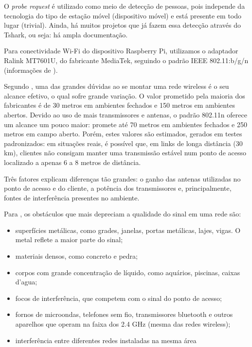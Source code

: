 O \emph{probe request} é utilizado como meio de detecção de pessoas, pois
independe da tecnologia do tipo de estação móvel (dispositivo móvel) e está presente em todo lugar (trivial). Ainda, há muitos projetos que já fazem essa detecção através do Tshark, ou seja: há ampla documentação.

Para conectividade Wi-Fi do dispositivo Raspberry Pi, utilizamos o adaptador Ralink MT7601U, do fabricante MediaTek, seguindo o padrão IEEE 802.11:b/g/n (informações de ).

Segundo , uma das grandes dúvidas ao se montar uma rede wireless é o seu alcance efetivo, o qual sofre grande variação. O valor prometido pela maioria dos fabricantes é de 30 metros em ambientes fechados e 150 metros em ambientes abertos. Devido ao uso de mais transmissores e antenas, o padrão 802.11n oferece um alcance um pouco maior: promete até 70 metros em ambientes fechados e 250 metros em campo aberto. Porém, estes valores são estimados, gerados em testes padronizados: em situações reais, é possível que, em links de longa distância (30 km), clientes não consigam manter uma transmissão estável num ponto de acesso localizado a apenas 6 a 8 metros de distância.

Três fatores explicam diferenças tão grandes: o ganho das antenas utilizadas no ponto de acesso e do cliente, a potência dos transmissores e, principalmente, fontes de interferência presentes no ambiente.

Para , os obstáculos que mais depreciam a qualidade do sinal em uma rede são:

\begin{itemize}
  \item superfícies metálicas, como grades, janelas, portas metálicas, lajes, vigas. O metal reflete a maior parte do sinal;
  \item materiais densos, como concreto e pedra;
  \item corpos com grande concentração de líquido, como aquários, piscinas, caixas d'agua;
	\item focos de interferência, que competem com o sinal do ponto de acesso;
	\item fornos de microondas, telefones sem fio, transmissores bluetooth e outros aparelhos que operam na faixa dos 2.4 GHz (mesma das redes wireless);
  \item interferência entre diferentes redes instaladas na mesma área
\end{itemize}

